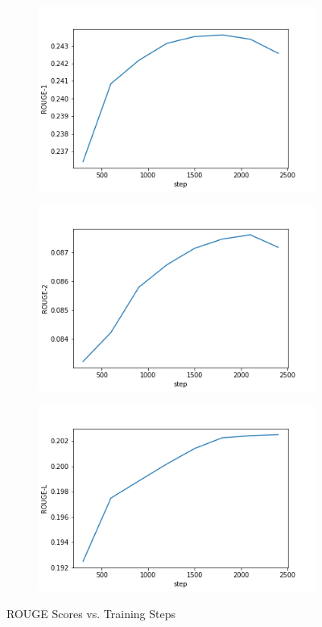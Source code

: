 \documentclass[10pt,a4paper]{article}
\begin{document}
\begin{figure}[H]
  \centering
  \begin{subfigure}{0.3\textwidth}
    \centering
    \includegraphics[width=\textwidth]{fig/rouge1.png}
  \end{subfigure}
  \hfill
  \begin{subfigure}{0.3\textwidth}
    \centering
    \includegraphics[width=\textwidth]{fig/rouge2.png}
  \end{subfigure}
  \hfill
  \begin{subfigure}{0.3\textwidth}
    \centering
    \includegraphics[width=\textwidth]{fig/rougel.png}
  \end{subfigure}
  \caption{ROUGE Scores vs. Training Steps}\label{fig:rouge}
\end{figure}
\end{document}
